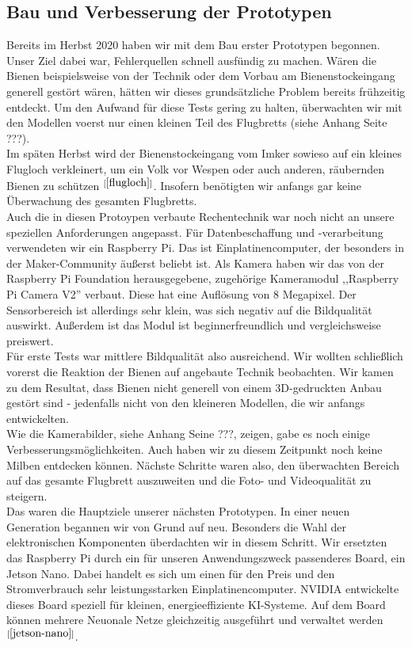 \documentclass[11pt,a4paper]{article}
\newcommand{\bibRef}[1]{\hyperlink{#1}{$^{[\ref*{#1}{}]}$}}
\begin{document}
\subsection{Bau und Verbesserung der Prototypen}
Bereits im Herbst 2020 haben wir mit dem Bau erster Prototypen begonnen. Unser Ziel dabei war, Fehlerquellen schnell ausfündig zu machen. Wären die Bienen beispielsweise von der Technik oder dem Vorbau am Bienenstockeingang generell gestört wären, hätten wir dieses grundsätzliche Problem bereits frühzeitig entdeckt. Um den Aufwand für diese Tests gering zu halten, überwachten wir mit den Modellen voerst nur einen kleinen Teil des Flugbretts (siehe Anhang Seite ???).\\
Im späten Herbst wird der Bienenstockeingang vom Imker sowieso auf ein kleines Flugloch verkleinert, um ein Volk vor Wespen oder auch anderen, räubernden Bienen zu schützen \bibRef{flugloch}. Insofern benötigten wir anfangs gar keine Überwachung des gesamten Flugbretts.\\
Auch die in diesen Protoypen verbaute Rechentechnik war noch nicht an unsere speziellen Anforderungen angepasst. Für Datenbeschaffung und -verarbeitung verwendeten wir ein Raspberry Pi. Das ist Einplatinencomputer, der besonders in der Maker-Community äußerst beliebt ist. Als Kamera haben wir das von der Raspberry Pi Foundation herausgegebene, zugehörige Kameramodul ,,Raspberry Pi Camera V2'' verbaut. Diese hat eine Auflösung von 8 Megapixel. Der Sensorbereich ist allerdings sehr klein, was sich negativ auf die Bildqualität auswirkt. Außerdem ist das Modul ist beginnerfreundlich und vergleichsweise preiswert.\\
Für erste Tests war mittlere Bildqualität also ausreichend. Wir wollten schließlich vorerst die Reaktion der Bienen auf angebaute Technik beobachten. Wir kamen zu dem Resultat, dass Bienen nicht generell von einem 3D-gedruckten Anbau gestört sind - jedenfalls nicht von den kleineren Modellen, die wir anfangs entwickelten.\\
Wie die Kamerabilder, siehe Anhang Seine ???, zeigen, gabe es noch einige Verbesserungsmöglichkeiten. Auch haben wir zu diesem Zeitpunkt noch keine Milben entdecken können. Nächste Schritte waren also, den überwachten Bereich auf das gesamte Flugbrett auszuweiten und die Foto- und Videoqualität zu steigern.\\
Das waren die Hauptziele unserer nächsten Prototypen. In einer neuen Generation begannen wir von Grund auf neu. Besonders die Wahl der elektronischen Komponenten überdachten wir in diesem Schritt. Wir ersetzten das Raspberry Pi durch ein für unseren Anwendungszweck passenderes Board, ein Jetson Nano. Dabei handelt es sich um einen für den Preis und den Stromverbrauch sehr leistungsstarken Einplatinencomputer. NVIDIA entwickelte dieses Board speziell für kleinen, energieeffiziente KI-Systeme. Auf dem Board können mehrere Neuonale Netze gleichzeitig ausgeführt und verwaltet werden\bibRef{jetson-nano}.\\
\end{document}
